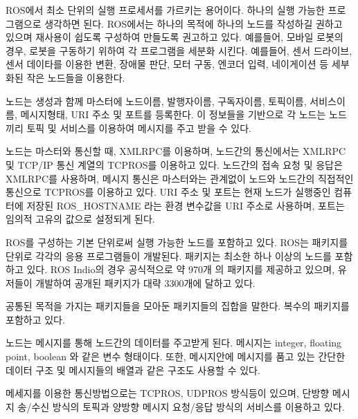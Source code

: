 \vspace{\baselineskip}
\begin{definition}[노드(node)]\label{def:RosNode}
ROS에서 최소 단위의 실행 프로세서를 가르키는 용어이다. 하나의 실행 가능한 프로그램으로 생각하면 된다. ROS에서는 하나의 목적에 하나의 노드를 작성하길 권하고 있으며 재사용이 쉽도록 구성하여 만들도록 권고하고 있다. 예를들어, 모바일 로봇의 경우, 로봇을 구동하기 위하여 각 프로그램을 세분화 시킨다. 예를들어, 센서 드라이브, 센서 데이타를 이용한 변환, 장애물 판단, 모터 구동, 엔코더 입력, 네이게이션 등 세부화된 작은 노드들을 이용한다.

노드는 생성과 함께 마스터에 노드이름, 발행자이름, 구독자이름, 토픽이름, 서비스이름, 메시지형태, URI 주소 및 포트를 등록한다. 이 정보들을 기반으로 각 노드는 노드끼리 토픽 및 서비스를 이용하여 메시지를 주고 받을 수 있다.

노드는 마스터와 통신할 때, XMLRPC를 이용하며, 노드간의 통신에서는 XMLRPC 및 TCP/IP 통신 계열의 TCPROS를 이용하고 있다. 노드간의 접속 요청 및 응답은  XMLRPC를 사용하며, 메시지 통신은 마스터와는 관계없이 노드와 노드간의 직접적인 통신으로 TCPROS를 이용하고 있다. URI 주소 및 포트는 현재 노드가 실행중인 컴퓨터에 저장된 ROS\_HOSTNAME 라는 환경 변수값을 URI 주소로 사용하며, 포트는 임의적 고유의 값으로 설정되게 된다.  
\end{definition}

\vspace{\baselineskip}
\begin{definition}\label{def:RosPackage}
ROS를 구성하는 기본 단위로써 실행 가능한 노드를 포함하고 있다. ROS는 패키지를 단위로 각각의 응용 프로그램들이 개발된다. 패키지는 최소한 하나 이상의 노드를 포함하고 있다. ROS Indio의 경우 공식적으로 약 970개 의 패키지를 제공하고 있으며, 유저들이 개발하여 공개된 패키지가 대략 3300개에 달하고 있다. 
\end{definition}

\vspace{\baselineskip}
\begin{definition}\label{def:RosMetapackage}
공통된 목적을 가지는 패키지들을 모아둔 패키지들의 집합을 말한다. 복수의 패키지를 포함하고 있다.
\end{definition}

\vspace{\baselineskip}
\begin{definition}\label{def:RosMessage}
노드는 메시지를 통해 노드간의 데이터를 주고받게 된다. 메시지는 integer, floating point, boolean 와 같은 변수 형태이다. 또한, 메시지안에 메시지를 품고 있는 간단한 데이터 구조 및 메시지들의 배열과 같은 구조도 사용할 수 있다. 

메세지를 이용한 통신방법으로는 TCPROS, UDPROS 방식등이 있으며, 단방향 메시지 송/수신 방식의 토픽과 양방향 메시지 요청/응답 방식의 서비스를 이용하고 있다.
\end{definition}

